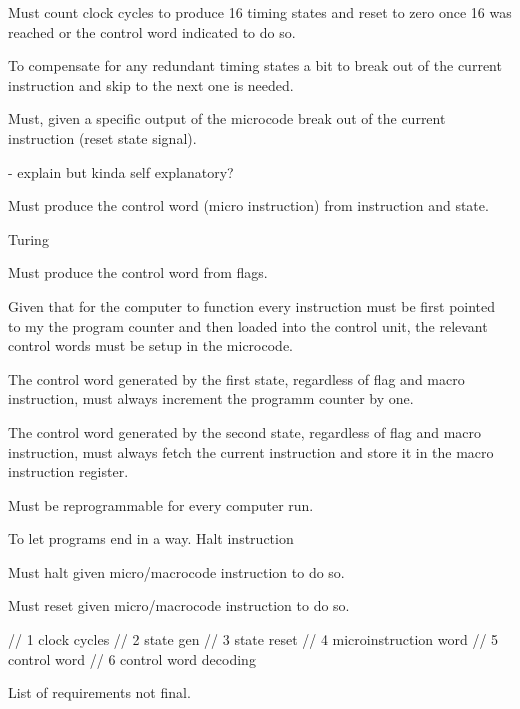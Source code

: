 \begin{arch-requirement}
  Must count clock cycles to produce 16 timing states and reset to zero once 16 was reached or the control word indicated to do so.
\end{arch-requirement}

To compensate for any redundant timing states a bit to break out of the current instruction and skip to the next one is needed. 
\begin{feat-requirement}
  Must, given a specific output of the microcode break out of the current instruction (reset state signal).
\end{feat-requirement}



- explain but kinda self explanatory?
\begin{arch-requirement}
  Must produce the control word (micro instruction) from instruction and state.
\end{arch-requirement}

Turing
\begin{turing-requirement}
  Must produce the control word from flags.
\end{turing-requirement}



Given that for the computer to function every instruction must be first pointed to my the program counter and then loaded into the control unit, the relevant control words must be setup in the microcode. 
\begin{feat-requirement}
  The control word generated by the first state, regardless of flag and macro instruction, must always increment the programm counter by one. 
\end{feat-requirement}

\begin{feat-requirement}
  The control word generated by the second state, regardless of flag and macro instruction, must always fetch the current instruction and store it in the macro instruction register.
\end{feat-requirement}


\begin{feat-requirement}
  Must be reprogrammable for every computer run.
\end{feat-requirement}






To let programs end in a way. Halt instruction

\begin{feat-requirement}
  Must halt given micro/macrocode instruction to do so. 
\end{feat-requirement}

\begin{feat-requirement}
  Must reset given micro/macrocode instruction to do so. 
\end{feat-requirement}
// 1 clock cycles
    // 2 state gen
    // 3 state reset
    // 4 microinstruction word
    // 5 control word
    // 6 control word decoding
    
List of requirements not final.


